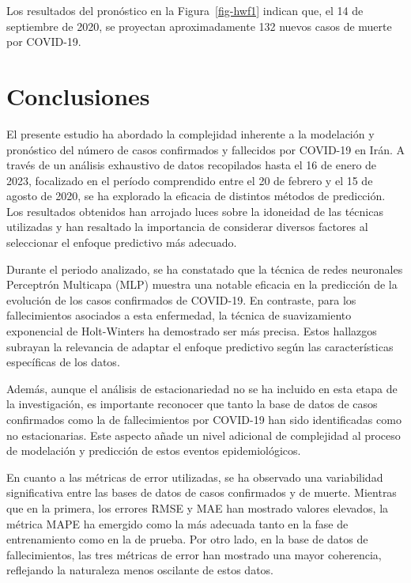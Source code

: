 \documentclass[
  us-letterpaper,
]{scrreprt}
\theoremstyle{plain}
\theoremstyle{definition}
\theoremstyle{definition}
\theoremstyle{plain}
\theoremstyle{remark}
\begin{document}
Los resultados del pronóstico en la Figura~\ref{fig-hwf1} indican que,
el 14 de septiembre de 2020, se proyectan aproximadamente 132 nuevos
casos de muerte por COVID-19.


\chapter{Conclusiones}\label{conclusiones}

El presente estudio ha abordado la complejidad inherente a la modelación
y pronóstico del número de casos confirmados y fallecidos por COVID-19
en Irán. A través de un análisis exhaustivo de datos recopilados hasta
el 16 de enero de 2023, focalizado en el período comprendido entre el 20
de febrero y el 15 de agosto de 2020, se ha explorado la eficacia de
distintos métodos de predicción. Los resultados obtenidos han arrojado
luces sobre la idoneidad de las técnicas utilizadas y han resaltado la
importancia de considerar diversos factores al seleccionar el enfoque
predictivo más adecuado.

Durante el periodo analizado, se ha constatado que la técnica de redes
neuronales Perceptrón Multicapa (MLP) muestra una notable eficacia en la
predicción de la evolución de los casos confirmados de COVID-19. En
contraste, para los fallecimientos asociados a esta enfermedad, la
técnica de suavizamiento exponencial de Holt-Winters ha demostrado ser
más precisa. Estos hallazgos subrayan la relevancia de adaptar el
enfoque predictivo según las características específicas de los datos.

Además, aunque el análisis de estacionariedad no se ha incluido en esta
etapa de la investigación, es importante reconocer que tanto la base de
datos de casos confirmados como la de fallecimientos por COVID-19 han
sido identificadas como no estacionarias. Este aspecto añade un nivel
adicional de complejidad al proceso de modelación y predicción de estos
eventos epidemiológicos.

En cuanto a las métricas de error utilizadas, se ha observado una
variabilidad significativa entre las bases de datos de casos confirmados
y de muerte. Mientras que en la primera, los errores RMSE y MAE han
mostrado valores elevados, la métrica MAPE ha emergido como la más
adecuada tanto en la fase de entrenamiento como en la de prueba. Por
otro lado, en la base de datos de fallecimientos, las tres métricas de
error han mostrado una mayor coherencia, reflejando la naturaleza menos
oscilante de estos datos.
\end{document}
